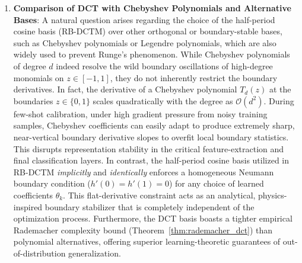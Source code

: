 \begin{enumerate}
    Furthermore, the implicit homogeneous Neumann boundary condition ($h'(0) = h'(1) = 0$) forced by RB-DCTM is incredibly beneficial for LLM merging: it ensures that ensembling weights remain stable and flat in the highly sensitive embedding projection layers and final vocabulary projection heads (LM heads), protecting the delicate token representation topology and classification logit margins from destructive interference. When merging Parameter-Efficient Fine-Tuning (PEFT) models like LoRAs, our spectral trajectories can directly parameterize the ensembling weights of LoRA adapter matrices across layers, ensuring robust multi-task assembly with negligible computational and memory overhead.

    \item \textbf{Comparison of DCT with Chebyshev Polynomials and Alternative Bases}:
    A natural question arises regarding the choice of the half-period cosine basis (RB-DCTM) over other orthogonal or boundary-stable bases, such as Chebyshev polynomials or Legendre polynomials, which are also widely used to prevent Runge's phenomenon. 
    While Chebyshev polynomials of degree $d$ indeed resolve the wild boundary oscillations of high-degree monomials on $z \in [-1, 1]$, they do not inherently restrict the boundary derivatives. In fact, the derivative of a Chebyshev polynomial $T_d(z)$ at the boundaries $z \in \{0, 1\}$ scales quadratically with the degree as $\mathcal{O}(d^2)$. During few-shot calibration, under high gradient pressure from noisy training samples, Chebyshev coefficients can easily adapt to produce extremely sharp, near-vertical boundary derivative slopes to overfit local boundary statistics. This disrupts representation stability in the critical feature-extraction and final classification layers. 
    In contrast, the half-period cosine basis utilized in RB-DCTM \emph{implicitly} and \emph{identically} enforces a homogeneous Neumann boundary condition ($h'(0) = h'(1) = 0$) for any choice of learned coefficients $\theta_k$. This flat-derivative constraint acts as an analytical, physics-inspired boundary stabilizer that is completely independent of the optimization process. Furthermore, the DCT basis boasts a tighter empirical Rademacher complexity bound (Theorem~\ref{thm:rademacher_dct}) than polynomial alternatives, offering superior learning-theoretic guarantees of out-of-distribution generalization.


\end{enumerate}
